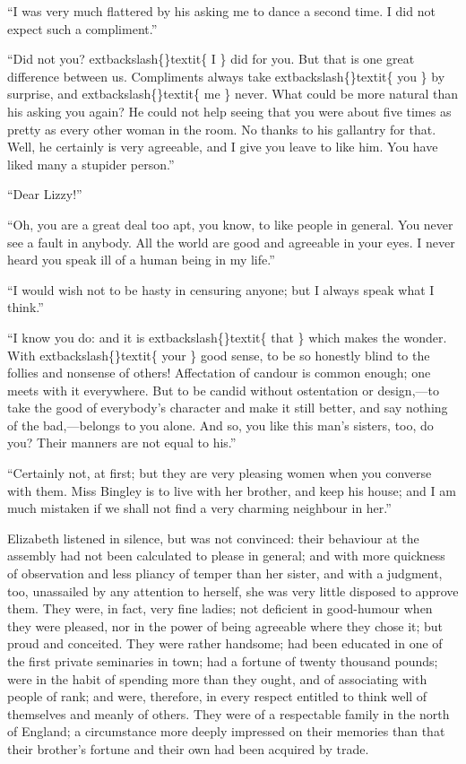 \documentclass[10pt]{book}
\begin{document}
   “I was very much flattered by his asking me to dance a second time. I
did not expect such a compliment.”
  

   “Did not you?
   	extbackslash\{\}textit\{
    I
   \}
   did for you. But that is one great difference between
us. Compliments always take
   	extbackslash\{\}textit\{
    you
   \}
   by surprise, and
   	extbackslash\{\}textit\{
    me
   \}
   never. What
could be more natural than his asking you again? He could not help
seeing that you
   were about five times as pretty as every other woman in
the room. No thanks to his gallantry for that. Well, he certainly is
very agreeable, and I give you leave to like him. You have liked many a
stupider person.”
  

   “Dear Lizzy!”
  

   “Oh, you are a great deal too apt, you know, to like people in general.
You never see a fault in anybody. All the world are good and agreeable
in your eyes. I never heard you speak ill of a human being in my life.”
  

   “I would wish not to be hasty in censuring anyone; but I always speak
what I think.”
  

   “I know you do: and it is
   	extbackslash\{\}textit\{
    that
   \}
   which makes the wonder. With
   	extbackslash\{\}textit\{
    your
   \}
   good sense, to be so honestly blind to the follies and nonsense of
others! Affectation of candour is common enough; one meets with it
everywhere. But to be candid without ostentation or design,—to take the
good of everybody’s character and make it still better, and say nothing
of the bad,—belongs to you alone. And so, you like this man’s sisters,
too, do you? Their manners are not equal to his.”
  

   “Certainly not, at first; but they are very pleasing women when you
converse with them. Miss Bingley is to live with her brother, and keep
his house; and I am much mistaken if we shall not find a very charming
neighbour in her.”
  

   Elizabeth listened in silence, but was not convinced: their behaviour at
the assembly had not been calculated to please in general; and with more
quickness of observation and less pliancy of temper than her sister, and
with a judgment, too, unassailed by any attention to herself, she was
very little disposed to approve them. They were, in fact, very fine
ladies; not deficient in good-humour when they were pleased, nor in the
power
   of being agreeable where they chose it; but proud and conceited.
They were rather handsome; had been educated in one of the first private
seminaries in town; had a fortune of twenty thousand pounds; were in the
habit of spending more than they ought, and of associating with people
of rank; and were, therefore, in every respect entitled to think well of
themselves and meanly of others. They were of a respectable family in
the north of England; a circumstance more deeply impressed on their
memories than that their brother’s fortune and their own had been
acquired by trade.
  
\end{document}
